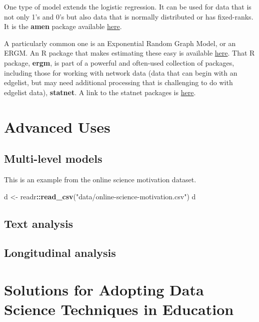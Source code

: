 \documentclass[]{book}
\newenvironment{Shaded}{\begin{snugshade}}{\end{snugshade}}
\newcommand{\KeywordTok}[1]{\textcolor[rgb]{0.13,0.29,0.53}{\textbf{#1}}}
\newcommand{\StringTok}[1]{\textcolor[rgb]{0.31,0.60,0.02}{#1}}
\newcommand{\OperatorTok}[1]{\textcolor[rgb]{0.81,0.36,0.00}{\textbf{#1}}}
\newcommand{\NormalTok}[1]{#1}
\begin{document}
One type of model extends the logistic regression. It can be used for
data that is not only 1's and 0's but also data that is normally
distributed or has fixed-ranks. It is the \textbf{amen} package
available
\href{https://cran.r-project.org/web/packages/amen/index.html}{here}.

A particularly common one is an Exponential Random Graph Model, or an
ERGM. An R package that makes estimating these easy is available
\href{https://cran.r-project.org/web/packages/ergm/index.html}{here}.
That R package, \textbf{ergm}, is part of a powerful and often-used
collection of packages, including those for working with network data
(data that can begin with an edgelist, but may need additional
processing that is challenging to do with edgelist data),
\textbf{statnet}. A link to the statnet packages is
\href{https://statnet.org/}{here}.

\chapter{Advanced Uses}\label{advanced-uses}

\section{Multi-level models}\label{multi-level-models}

This is an example from the online science motivation dataset.

\begin{Shaded}
\begin{Highlighting}[]
\NormalTok{d <-}\StringTok{ }\NormalTok{readr}\OperatorTok{::}\KeywordTok{read_csv}\NormalTok{(}\StringTok{"data/online-science-motivation.csv"}\NormalTok{)}
\NormalTok{d}
\end{Highlighting}
\end{Shaded}

\section{Text analysis}\label{text-analysis}

\section{Longitudinal analysis}\label{longitudinal-analysis}

\chapter{Solutions for Adopting Data Science Techniques in
Education}\label{solutions-for-adopting-data-science-techniques-in-education}
\end{document}
